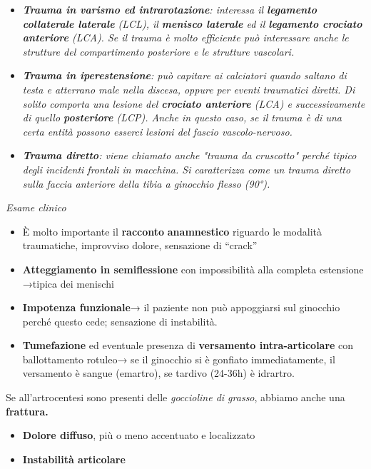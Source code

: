 \documentclass[]{article}
\begin{document}
\begin{itemize}
\item
  \emph{\textbf{Trauma in varismo ed intrarotazione}: interessa il
  \textbf{legamento collaterale laterale} (LCL), il \textbf{menisco
  laterale} ed il \textbf{legamento crociato anteriore} (LCA). Se il
  trauma è molto efficiente può interessare anche le strutture del
  compartimento posteriore e le strutture vascolari. }
\item
  \emph{\textbf{Trauma in iperestensione}: può capitare ai calciatori
  quando saltano di testa e atterrano male nella discesa, oppure per
  eventi traumatici diretti. Di solito comporta una lesione del
  \textbf{crociato anteriore} (LCA) e successivamente di quello
  \textbf{posteriore} (LCP). Anche in questo caso, se il trauma è di una
  certa entità possono esserci lesioni del fascio vascolo-nervoso. }
\item
  \emph{\textbf{Trauma diretto}: viene chiamato anche "trauma da
  cruscotto" perché tipico degli incidenti frontali in macchina. Si
  caratterizza come un trauma diretto sulla faccia anteriore della tibia
  a ginocchio flesso (90°). }
\end{itemize}

\emph{Esame clinico}

\begin{itemize}
\item
  È molto importante il \textbf{racconto} \textbf{anamnestico} riguardo
  le modalità traumatiche, improvviso dolore, sensazione di ``crack''
\item
  \textbf{Atteggiamento in semiflessione} con impossibilità alla
  completa estensione →tipica dei menischi
\item
  \textbf{Impotenza funzionale}→ il paziente non può appoggiarsi sul
  ginocchio perché questo cede; sensazione di instabilità.
\item
  \textbf{Tumefazione} ed eventuale presenza di \textbf{versamento
  intra-articolare} con ballottamento rotuleo→ se il ginocchio si è
  gonfiato immediatamente, il versamento è sangue (emartro), se tardivo
  (24-36h) è idrartro.
\end{itemize}

Se all'artrocentesi sono presenti delle \emph{goccioline di grasso},
abbiamo anche una \textbf{frattura.}

\begin{itemize}
\item
  \textbf{Dolore diffuso}, più o meno accentuato e localizzato
\item
  \textbf{Instabilità articolare }
\end{itemize}
\end{document}
